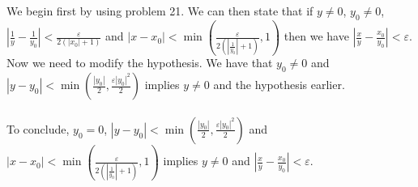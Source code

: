 \begin{hproblem}
	We begin first by using problem 21. We can then state that if $y\neq0$, $y_0\neq0$, $\left| \frac{1}{y}-\frac{1}{y_0}\right| < \frac{\varepsilon}{2(|x_0|+1)}$ and $|x-x_0|<\min \left( \frac{\varepsilon}{2(\left| \frac{1}{y_0}\right| +1)},1 \right)$ then we have $\left| \frac{x}{y}-\frac{x_0}{y_0}\right| < \varepsilon$. Now we need to modify the hypothesis. We have that $y_0\neq 0$ and $|y-y_0| < \min \left( \frac{|y_0|}{2},\frac{\varepsilon|y_0|^2}{2} \right)$ implies $y\neq 0$ and the hypothesis earlier.\\\\
	To conclude, $y_0=0$, $|y-y_0| < \min \left( \frac{|y_0|}{2}, \frac{\varepsilon|y_0|^2}{2} \right)$ and $|x-x_0|<\min \left( \frac{\varepsilon}{2(\left| \frac{1}{y_0}\right| +1)},1 \right)$ implies $y\neq0$ and $\left| \frac{x}{y}-\frac{x_0}{y_0}\right| < \varepsilon$.
\end{hproblem}

